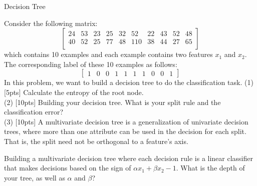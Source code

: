 \documentclass[11pt, a4paper, UTF8]{ctexart}
\begin{document}
\begin{problem}[ML problem 2]
[25pts] {Decision Tree}

	Consider the following matrix:
$$
\left[
\begin{matrix}
24 & 53 & 23 & 25 & 32 & 52 & 22 & 43 & 52 & 48 \\
40 & 52 & 25 & 77 & 48 & 110 & 38 & 44 & 27 & 65\\
\end{matrix}
\right]
$$
which contains 10 examples and each example contains two features $x_1$ and $x_2$. The corresponding label of these 10 examples as follows:
$$
\left[
\begin{matrix}
1 & 0 & 0 &1 & 1 & 1 & 1& 0 & 0 & 1
\end{matrix}
\right]
$$
In this problem, we want to build a decision tree to do the classification task.
(1) [5pts] Calculate the entropy of the root node.\\
(2) [10pts] Building your decision tree. What is your split rule  and the classification error?\\
(3) [10pts] A multivariate decision tree is a generalization of  univariate decision trees, where more than one attribute can be used in the decision for each split. That is, the split need not be orthogonal to a feature's axis.

Building a multivariate decision tree where each decision rule is a linear classifier that makes decisions based on the sign of $\alpha x_1 + \beta x_2 - 1$. What is the depth of your tree, as well as $\alpha$ and $\beta$?

\end{problem}
\end{document}
